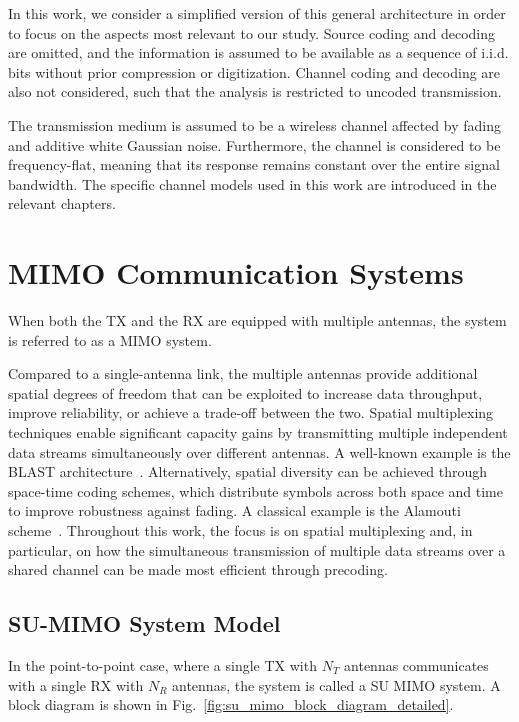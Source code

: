 In this work, we consider a simplified version of this general architecture in order to focus on the aspects most relevant to our study.
Source coding and decoding are omitted, and the information is assumed to be available as a sequence of \ac{i.i.d.} bits without prior compression or digitization.
Channel coding and decoding are also not considered, such that the analysis is restricted to uncoded transmission.

The transmission medium is assumed to be a wireless channel affected by fading and additive white Gaussian noise. Furthermore, the channel is considered to be frequency-flat, meaning that its response remains constant over the entire signal bandwidth. The specific channel models used in this work are introduced in the relevant chapters.


\section{MIMO Communication Systems}
\label{section:mimo_communication_systems}

When both the \ac{TX} and the \ac{RX} are equipped with multiple antennas, the system is referred to as a \ac{MIMO} system.

Compared to a single-antenna link, the multiple antennas provide additional spatial degrees of freedom that can be exploited to increase data throughput, improve reliability, or achieve a trade-off between the two.
Spatial multiplexing techniques enable significant capacity gains by transmitting multiple independent data streams simultaneously over different antennas. A well-known example is the BLAST architecture~\cite{foschini_1998}.
Alternatively, spatial diversity can be achieved through space-time coding schemes, which distribute symbols across both space and time to improve robustness against fading. A classical example is the Alamouti scheme~\cite{alamouti_1998}.
Throughout this work, the focus is on spatial multiplexing and, in particular, on how the simultaneous transmission of multiple data streams over a shared channel can be made most efficient through precoding.

\subsection{SU-MIMO System Model}
\label{subsection:su_mimo_system_model}

In the point-to-point case, where a single \ac{TX} with $N_T$ antennas communicates with a single \ac{RX} with $N_R$ antennas, the system is called a \ac{SU} \ac{MIMO} system. A block diagram is shown in Fig.~\ref{fig:su_mimo_block_diagram_detailed}.

